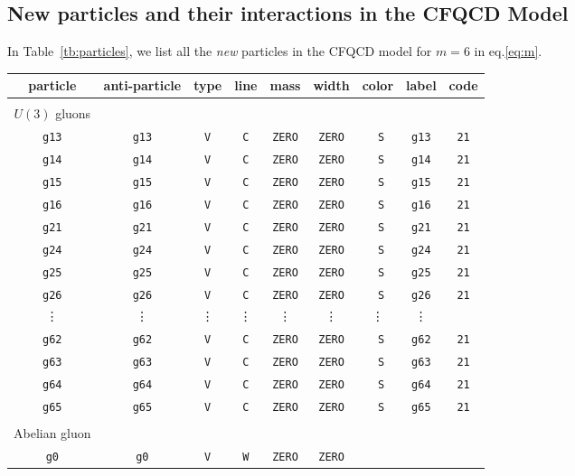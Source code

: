 \documentclass[a4paper,11pt]{article}
\begin{document}
\subsection{New particles and their interactions in the CFQCD Model}
In Table~\ref{tb:particles}, we list all the {\it new} particles in the CFQCD
model for $m=6$ in eq.\eqref{eq:m}.
\begin{table}
\begin{center}
\small
\begin{tabular}{ccccccccc}
\hline\hline
particle & anti-particle & type & line & mass & width & color & label &
 code\\
\hline\\
$U(3)$ gluons\\
{\tt g13}&{\tt g13}& {\tt V}&{\tt C}& {\tt ZERO} &{\tt ZERO}&{\tt
			 S}&{\tt g13}&{\tt 21}\\
{\tt g14}&{\tt g14}& {\tt V}&{\tt C}& {\tt ZERO} &{\tt ZERO}&{\tt
			 S}&{\tt g14}&{\tt 21}\\
{\tt g15}&{\tt g15}& {\tt V}&{\tt C}& {\tt ZERO} &{\tt ZERO}&{\tt
			 S}&{\tt g15}&{\tt 21}\\
{\tt g16}&{\tt g16}& {\tt V}&{\tt C}& {\tt ZERO} &{\tt ZERO}&{\tt
			 S}&{\tt g16}&{\tt 21}\\
{\tt g21}&{\tt g21}& {\tt V}&{\tt C}& {\tt ZERO} &{\tt ZERO}&{\tt
			 S}&{\tt g21}&{\tt 21}\\
{\tt g24}&{\tt g24}& {\tt V}&{\tt C}& {\tt ZERO} &{\tt ZERO}&{\tt
			 S}&{\tt g24}&{\tt 21}\\
{\tt g25}&{\tt g25}& {\tt V}&{\tt C}& {\tt ZERO} &{\tt ZERO}&{\tt
			 S}&{\tt g25}&{\tt 21}\\
{\tt g26}&{\tt g26}& {\tt V}&{\tt C}& {\tt ZERO} &{\tt ZERO}&{\tt
			 S}&{\tt g26}&{\tt 21}\\
\vdots&\vdots&\vdots&\vdots&\vdots&\vdots&\vdots&\vdots&\\
{\tt g62}&{\tt g62}& {\tt V}&{\tt C}& {\tt ZERO} &{\tt ZERO}&{\tt
			 S}&{\tt g62}&{\tt 21}\\
{\tt g63}&{\tt g63}& {\tt V}&{\tt C}& {\tt ZERO} &{\tt ZERO}&{\tt
			 S}&{\tt g63}&{\tt 21}\\
{\tt g64}&{\tt g64}& {\tt V}&{\tt C}& {\tt ZERO} &{\tt ZERO}&{\tt
			 S}&{\tt g64}&{\tt 21}\\
{\tt g65}&{\tt g65}& {\tt V}&{\tt C}& {\tt ZERO} &{\tt ZERO}&{\tt
			 S}&{\tt g65}&{\tt 21}\\\\
Abelian gluon\\
{\tt g0}&{\tt g0}& {\tt V}&{\tt W}& {\tt ZERO} &{\tt ZERO}&{\tt
}
\end{tabular}
\end{center}
\end{table}
\end{document}
